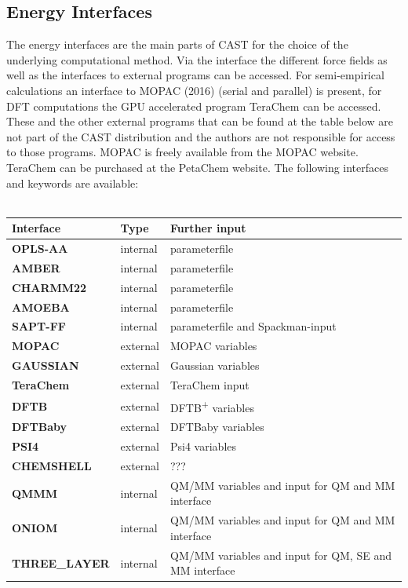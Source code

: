 \documentclass[10pt,a4paper]{article} %
\newif\ifverbose %
\begin{document}
	\subsection{Energy Interfaces}
	The energy interfaces are the main parts of \ac{CAST} for the choice of the underlying computational method. Via the interface the different force fields as well as the interfaces to external programs can be accessed. For semi-empirical calculations an interface to \ac{MOPAC} (2016) (serial\supercite{mopac} and parallel\supercite{mopac_parallel}) is present, for \ac{DFT} computations the \ac{GPU} accelerated program TeraChem\supercite{terachem} can be accessed. These and the other external programs that can be found at the table below are not part of the \ac{CAST} distribution and the authors are not responsible for access to those programs. \ac{MOPAC}\supercite{mopac, mopac_parallel} is freely available from the \ac{MOPAC} website. TeraChem\supercite{terachem} can be purchased at the PetaChem website.
	The following interfaces and keywords are available:\\~\\
	\begin{tabularx}{\textwidth}{l|l|l}
		Interface & Type & Further input \\
		\hline
		\textbf{OPLS-AA} & internal & parameterfile \\
		\textbf{AMBER} & internal & parameterfile \\
		\textbf{CHARMM22} & internal & parameterfile \\
		\textbf{AMOEBA} & internal & parameterfile\\
		\textbf{SAPT-FF} & internal &parameterfile and Spackman-input\\
		\textbf{MOPAC} & external & MOPAC variables\\
		\textbf{GAUSSIAN} & external & Gaussian variables\\
		\textbf{TeraChem} & external & TeraChem input\\
		\textbf{DFTB} & external & DFTB\textsuperscript{+} variables\\
		\textbf{DFTBaby} & external & DFTBaby variables\\
		\textbf{PSI4} & external & Psi4 variables\\
		\textbf{CHEMSHELL} & external & ???\\
		\textbf{QMMM} & internal & QM/MM variables and input for QM and MM interface\\
		\textbf{ONIOM} & internal &  QM/MM variables and input for QM and MM interface\\
		\textbf{THREE\_LAYER} & internal &  QM/MM variables and input for QM, SE and MM interface\\
	\end{tabularx}	\\~\\
	\ifverbose
	In contrast to the force fields, the external interfaces do not need correct force field parameters. The coordinate file has to be in TINKER\supercite{tinker} format, however, it can be generated with arbitrary parameters.
	\fi
\end{document}

